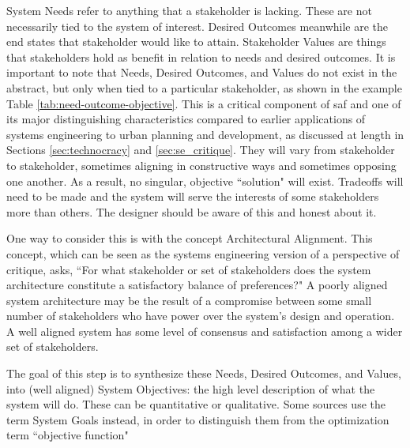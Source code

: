 System Needs refer to anything that a stakeholder is lacking. These are not necessarily tied to the system of interest. Desired Outcomes meanwhile are the end states that stakeholder would like to attain. Stakeholder Values are things that stakeholders hold as benefit in relation to needs and desired outcomes. It is important to note that Needs, Desired Outcomes, and Values do not exist in the abstract, but only when tied to a particular stakeholder, as shown in the example Table \ref{tab:need-outcome-objective}. This is a critical component of \ac{saf} and one of its major distinguishing characteristics compared to earlier applications of systems engineering to urban planning and development, as discussed at length in Sections \ref{sec:technocracy} and \ref{sec:se_critique}. They will vary from stakeholder to stakeholder, sometimes aligning in constructive ways and sometimes opposing one another. As a result, no singular, objective ``solution" will exist. Tradeoffs will need to be made and the system will serve the interests of some stakeholders more than others. The designer should be aware of this and honest about it.

One way to consider this is with the concept Architectural Alignment. This concept, which can be seen as the systems engineering version of a perspective of critique, asks, ``For what stakeholder or set of stakeholders does the system architecture constitute a satisfactory balance of preferences?" A poorly aligned system architecture may be the result of a compromise between some small number of stakeholders who have power over the system's design and operation. A well aligned system has some level of consensus and satisfaction among a wider set of stakeholders.

The goal of this step is to synthesize these Needs, Desired Outcomes, and Values, into (well aligned) System Objectives: the high level description of what the system will do. These can be quantitative or qualitative. Some sources use the term System Goals instead, in order to distinguish them from the optimization term ``objective function" \cite{nasaofficeofthechiefengineerNASASystemsEngineering2004}

